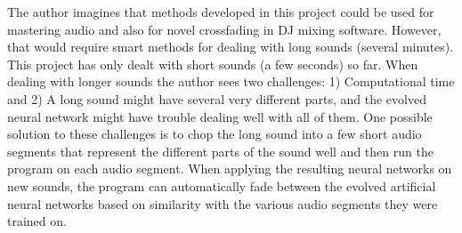 

The author imagines that methods developed in this project could be used for mastering audio and also for novel crossfading in DJ mixing software. However, that would require smart methods for dealing with long sounds (several minutes). This project has only dealt with short sounds (a few seconds) so far. When dealing with longer sounds the author sees two challenges: 1) Computational time and 2) A long sound might have several very different parts, and the evolved neural network might have trouble dealing well with all of them. One possible solution to these challenges is to chop the long sound into a few short audio segments that represent the different parts of the sound well and then run the program on each audio segment. When applying the resulting neural networks on new sounds, the program can automatically fade between the evolved artificial neural networks based on similarity with the various audio segments they were trained on.